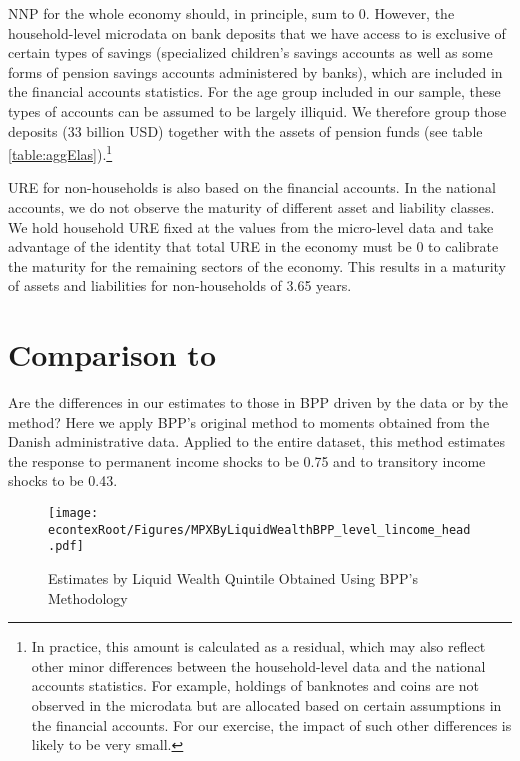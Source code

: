 \documentclass[titlepage]{\econtex}\newcommand{\texname}{ConsumptionHeterogeneity}
\begin{document}
	NNP for the whole economy should, in principle, sum to 0. However, the household-level microdata on bank deposits that we have access to is exclusive of certain types of savings (specialized children's savings accounts as well as some forms of pension savings accounts administered by banks), which are included in the financial accounts statistics. For the age group included in our sample, these types of accounts can be assumed to be largely illiquid. We therefore group those deposits (33 billion USD) together with the assets of pension funds (see table \ref{table:aggElas}).\footnote{In practice, this amount is calculated as a residual, which may also reflect other minor differences between the household-level data and the national accounts statistics. For example, holdings of banknotes and coins are not observed in the microdata but are allocated based on certain assumptions in the financial accounts. For our exercise, the impact of such other differences is likely to be very small.}
	
	URE for non-households is also based on the financial accounts. In the national accounts, we do not observe the maturity of different asset and liability classes. We hold household URE fixed at the values from the micro-level data and take advantage of the identity that total URE in the economy must be 0 to calibrate the maturity for the remaining sectors of the economy. This results in a maturity of assets and liabilities for non-households of 3.65 years.
	
	\section{Comparison to \cite{blundell_consumption_2008}} \label{BPP_compare}
	Are the differences in our estimates to those in BPP driven by the data or by the method? Here we apply BPP's original method to moments obtained from the Danish administrative data. Applied to the entire dataset, this method estimates the response to permanent income shocks to be 0.75 and to transitory income shocks to be 0.43. 
	
	\begin{figure} 
		\begin{centering}
			\texttt{[image: \\econtexRoot/Figures/MPXByLiquidWealthBPP\_level\_lincome\_head.pdf]}
			\caption{Estimates by Liquid Wealth Quintile Obtained Using BPP's Methodology}
			\label{fig:BPP_liquid}
		\end{centering}
	\end{figure}
	
\end{document}
